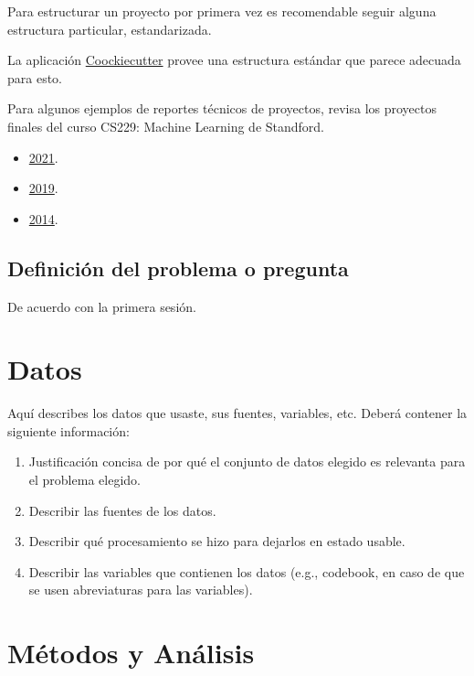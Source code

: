\documentclass[
  letterpaper,
  DIV=11,
  numbers=noendperiod]{scrartcl}
\providecommand{\tightlist}{%
  \setlength{\itemsep}{0pt}\setlength{\parskip}{0pt}}\usepackage{longtable,booktabs,array}
\begin{document}
Para estructurar un proyecto por primera vez es recomendable seguir
alguna estructura particular, estandarizada.

La aplicación
\href{https://drivendata.github.io/cookiecutter-data-science/}{Coockiecutter}
provee una estructura estándar que parece adecuada para esto.

Para algunos ejemplos de reportes técnicos de proyectos, revisa los
proyectos finales del curso CS229: Machine Learning de Standford.

\begin{itemize}
\tightlist
\item
  \href{http://cs229.stanford.edu/proj2021spr/}{2021}.
\item
  \href{http://cs229.stanford.edu/proj2019aut/}{2019}.
\item
  \href{http://cs229.stanford.edu/projects2014.html}{2014}.
\end{itemize}

\hypertarget{definiciuxf3n-del-problema-o-pregunta}{%
\subsection{Definición del problema o
pregunta}\label{definiciuxf3n-del-problema-o-pregunta}}

De acuerdo con la primera sesión.

\hypertarget{datos}{%
\section{Datos}\label{datos}}

Aquí describes los datos que usaste, sus fuentes, variables, etc. Deberá
contener la siguiente información:

\begin{enumerate}
\def\labelenumi{\arabic{enumi}.}
\tightlist
\item
  Justificación concisa de por qué el conjunto de datos elegido es
  relevanta para el problema elegido.
\item
  Describir las fuentes de los datos.
\item
  Describir qué procesamiento se hizo para dejarlos en estado usable.
\item
  Describir las variables que contienen los datos (e.g., codebook, en
  caso de que se usen abreviaturas para las variables).
\end{enumerate}

\hypertarget{muxe9todos-y-anuxe1lisis}{%
\section{Métodos y Análisis}\label{muxe9todos-y-anuxe1lisis}}
\end{document}
